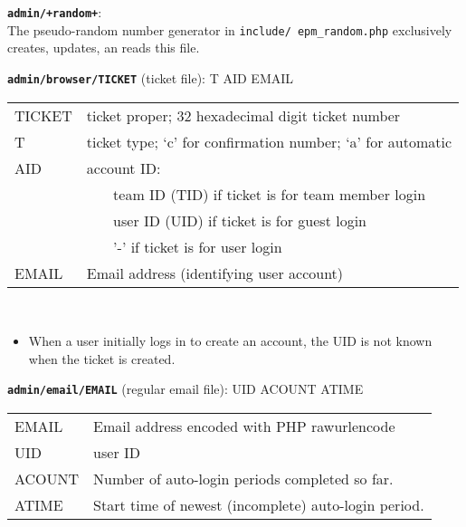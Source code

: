 \documentclass[12pt]{article}
\newenvironment{indpar}[1][0.4in]%
	{\begin{list}{}%
		     {\setlength{\itemsep}{0in}%
		      \setlength{\topsep}{0in}%
		      \setlength{\parsep}{1ex}%
		      \setlength{\labelwidth}{#1}%
		      \setlength{\leftmargin}{#1}%
		      \addtolength{\leftmargin}{\labelsep}}%
	 \item}%
	{\end{list}}
\newenvironment{itemlist}[1][0.2in]%
	{\begin{list}{}{\setlength{\labelwidth}{#1}%
		        \setlength{\leftmargin}{\labelwidth}%
		        \addtolength{\leftmargin}{+0.2in}%
		        \addtolength{\linewidth}{-\labelwidth}%
		        \addtolength{\linewidth}{-0.2in}%
		        \renewcommand{\makelabel}[1]{##1\hfill}}
	 \raggedright}%
	{\end{list}}
\newcommand{\TT}[1]{{\tt \bfseries #1}}
\newcommand{\EOL}{\penalty \exhyphenpenalty}
\begin{document}
\begin{indpar}
\begin{itemlist}
\item[\TT{admin/+random+}:]~
\label{ADMIN/RANDOM} \\
The pseudo-random number generator in {\tt include/\EOL
epm\_random.php} exclusively creates, updates, an reads this file.

\item[\TT{admin/browser/TICKET} (ticket file):] T AID EMAIL
\label{ADMIN/TICKET/TICKET} \\
\begin{tabular}[t]{lp{4.0in}}
TICKET & ticket proper; 32 hexadecimal digit ticket number \\
T & ticket type; `c' for confirmation number; `a' for automatic \\
AID & account ID: \\
    & ~~~ team ID (TID) if ticket is for team member login \\
    & ~~~ user ID (UID) if ticket is for guest login \\
    & ~~~ '-' if ticket is for user login \\
EMAIL & Email address (identifying user account) \\
\end{tabular}
\\
\begin{itemize}
\item When a user initially logs in to create an account,
the UID is not known when the ticket is created.
\end{itemize}

\item[\TT{admin/email/EMAIL} (regular email file):] UID ACOUNT ATIME
\label{ADMIN/EMAIL/EMAIL} \\
\begin{tabular}[t]{lp{4.0in}}
EMAIL & Email address encoded with PHP rawurlencode \\
UID & user ID \\
ACOUNT & Number of auto-login periods completed so far. \\
ATIME & Start time of newest (incomplete) auto-login period. \\
\end{tabular}


\end{itemlist}
\end{indpar}
\end{document}
